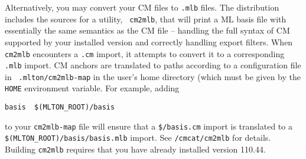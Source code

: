 Alternatively, you may convert your CM files to {\tt .mlb} files.  The
{\mlton} distribution includes the sources for a utility, {\tt
cm2mlb}, that will print a ML basis file with essentially the same
semantics as the CM file -- handling the full syntax of CM supported
by your installed {\smlnj} version and correctly handling export
filters.  When {\tt cm2mlb} encounters a {\tt .cm} import, it attempts
to convert it to a corresponding {\tt .mlb} import.  CM anchors are
translated to paths according to a configuration file in {\tt
.mlton/cm2mlb-map} in the user's home directory (which must be given
by the {\tt HOME} environment variable.  For example, adding
\begin{verbatim}
basis  $(MLTON_ROOT)/basis
\end{verbatim}
to your {\tt cm2mlb-map} file will ensure that a {\tt \$/basis.cm}
import is translated to a {\tt \$(MLTON\_ROOT)/basis/basis.mlb} import.
See {\tt \doc/cmcat/cm2mlb} for details.  Building {\tt cm2mlb}
requires that you have already installed {\smlnj} version 110.44.
